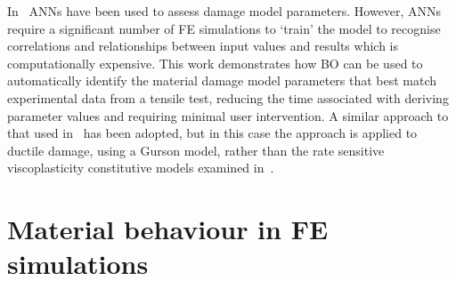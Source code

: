 \documentclass[preprint, review, 12pt]{elsarticle}
\begin{document}
	In~\cite{ABENDROTH2006, ABBASSI2013, CHAHBOUB2019, CHEN2021} ANNs have been used to assess damage model parameters.
	However, ANNs require a significant number of FE simulations to `train' the model to recognise correlations and relationships between input values and results which is computationally expensive.
	This work demonstrates how BO can be used to automatically identify the material damage model parameters that best match experimental data from a tensile test, reducing the time associated with deriving parameter values and requiring minimal user intervention.
	A similar approach to that used in~\citet{RYAN2022} has been adopted, but in this case the approach is applied to ductile damage, using a Gurson model, rather than the rate sensitive viscoplasticity constitutive models examined in~\citet{RYAN2022}.

	\section{Material behaviour in FE simulations}
	\label{h:general_material_behaviour}
\end{document}
